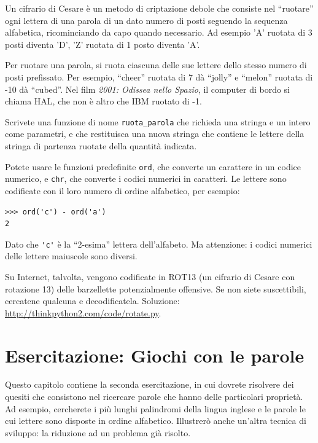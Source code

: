 \documentclass[10pt]{book}
\begin{document}
\vspace{0.2in}
\begin{exercise}


\label{exrotate}
Un cifrario di Cesare è un metodo di criptazione debole che consiste nel ``ruotare'' ogni lettera di una parola di un dato numero di posti seguendo la sequenza alfabetica, ricominciando da capo quando necessario. Ad esempio 'A' ruotata di 3 posti diventa 'D', 'Z' ruotata di 1 posto diventa 'A'.

Per ruotare una parola, si ruota ciascuna delle sue lettere dello stesso numero di posti prefissato.
Per esempio, ``cheer'' ruotata di 7 dà ``jolly'' e ``melon'' ruotata di -10
dà ``cubed''.  Nel film {\em 2001: Odissea nello Spazio}, il computer di bordo si chiama HAL, che non è altro che IBM ruotato di -1.

Scrivete una funzione di nome \verb"ruota_parola" che richieda una stringa e un intero come parametri, e che restituisca una nuova stringa che contiene le lettere della stringa di partenza ruotate della quantità indicata.

Potete usare le funzioni predefinite {\tt ord}, che converte un carattere in un codice numerico, e {\tt chr}, che converte i codici numerici in caratteri.
Le lettere sono codificate con il loro numero di ordine alfabetico, per esempio:

\begin{verbatim}
>>> ord('c') - ord('a')
2
\end{verbatim}

Dato che \verb"'c'" è la ``2-esima'' lettera dell'alfabeto.  Ma attenzione: i codici numerici delle lettere maiuscole sono diversi.

Su Internet, talvolta, vengono codificate in ROT13 (un cifrario di Cesare con rotazione 13) delle barzellette potenzialmente offensive. Se non siete suscettibili, cercatene qualcuna e decodificatela. Soluzione: \url{http://thinkpython2.com/code/rotate.py}.

\end{exercise}


\chapter{Esercitazione: Giochi con le parole}

Questo capitolo contiene la seconda esercitazione, in cui dovrete risolvere dei quesiti che consistono nel ricercare parole che hanno delle particolari proprietà. Ad esempio, cercherete i più lunghi palindromi della lingua inglese e le parole le cui lettere sono disposte in ordine alfabetico. Illustrerò anche un'altra tecnica di sviluppo: la riduzione ad un problema già risolto.
\end{document}
